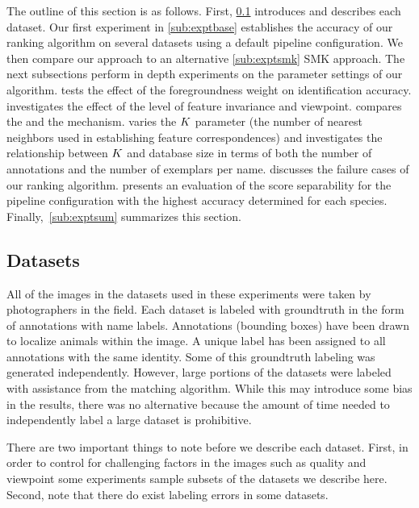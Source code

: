     The outline of this section is as follows.
    First, \cref{sub:datasets} introduces and describes each dataset.
    Our first experiment in \cref{sub:exptbase} establishes the accuracy of our ranking algorithm on several
      datasets using a default pipeline configuration.
    We then compare our approach to an alternative \cref{sub:exptsmk} SMK approach.
    The next subsections perform in depth experiments on the parameter settings of our algorithm.
     tests the effect of the foregroundness weight on identification accuracy.
     investigates the effect of the level of feature invariance and viewpoint.
     compares the \csumprefix{} and the \nsumprefix{} \namescoring{} mechanism.
     varies the $K$ parameter (the number of nearest neighbors used in establishing feature
      correspondences) and investigates the relationship between $K$ and database size in terms of both the number
      of annotations and the number of exemplars per name.
     discusses the failure cases of our ranking algorithm.
     presents an evaluation of the score separability for the pipeline configuration with the
      highest accuracy determined for each species.
    Finally,~\cref{sub:exptsum} summarizes this section.


    \subsection{Datasets}\label{sub:datasets}

        All of the images in the datasets used in these experiments were taken by photographers in the field.
        Each dataset is labeled with groundtruth in the form of annotations with name labels.
        Annotations (bounding boxes) have been drawn to localize animals within the image.
        A unique \name{} label has been assigned to all annotations with the same identity.
        Some of this groundtruth labeling was generated independently.
        However, large portions of the datasets were labeled with assistance from the matching algorithm.
        While this may introduce some bias in the results, there was no alternative because the amount of time
          needed to independently label a large dataset is prohibitive.

        There are two important things to note before we describe each dataset.
        First, in order to control for challenging factors in the images such as quality and viewpoint some
          experiments sample subsets of the datasets we describe here.
        Second, note that there do exist labeling errors in some datasets.

